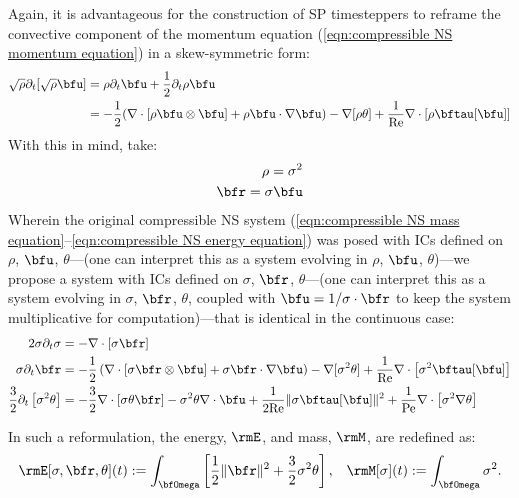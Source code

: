     \shortline

    Again, it is advantageous for the construction of SP timesteppers to reframe the convective component of the momentum equation (\ref{eqn:compressible NS momentum equation}) in a skew-symmetric form:
    \begin{align}
        \sqrt{\rho}\partial_{t}[\sqrt{\rho}\bfu]
        &=
        \rho\partial_{t}\bfu + \frac{1}{2}\partial_{t}\rho\bfu  \\
        &=
        - \frac{1}{2}(\nabla\cdot\left[\rho\bfu\otimes\bfu\right] + \rho\bfu\cdot\nabla\bfu) - \nabla[\rho\theta] + \frac{1}{\rmRe}\nabla\cdot[\rho\bftau[\bfu]]  \label{eqn:compressible NS skew-symmetric momentum equation}
    \end{align}
    With this in mind, take:
    \begin{align}
        \rho  =  \sigma^{2}  \label{eqn:sigma definition}  \\
        \bfr  =  \sigma\bfu  \label{eqn:r definition}
    \end{align}
    Wherein the original compressible NS system (\ref{eqn:compressible NS mass equation}--\ref{eqn:compressible NS energy equation}) was posed with ICs defined on $\rho$, $\bfu$, $\theta$---(one can interpret this as a system evolving in $\rho$, $\bfu$, $\theta$)---we propose a system with ICs defined on $\sigma$, $\bfr$, $\theta$---(one can interpret this as a system evolving in $\sigma$, $\bfr$, $\theta$, coupled with $\bfu = 1/\sigma\cdot\bfr$ to keep the system multiplicative for computation)---that is identical in the continuous case:
    \begin{align}
                                   2\sigma\partial_{t}\sigma  &=  - \nabla\cdot\left[\sigma\bfr\right]  \\
                                      \sigma\partial_{t}\bfr  &=  - \frac{1}{2}\left(\nabla\cdot\left[\sigma\bfr\otimes\bfu\right] + \sigma\bfr\cdot\nabla\bfu\right) - \nabla[\sigma^{2}\theta] + \frac{1}{\rmRe}\nabla\cdot\left[\sigma^{2}\bftau[\bfu]\right]  \\
        \frac{3}{2}\partial_{t}\left[\sigma^{2}\theta\right]  &=  - \frac{3}{2}\nabla\cdot\left[\sigma\theta\bfr\right] - \sigma^{2}\theta\nabla\cdot\bfu + \frac{1}{2\rmRe}\|\sigma\bftau[\bfu]\|^{2} + \frac{1}{\rmPe}\nabla\cdot\left[\sigma^{2}\nabla\theta\right]  \label{eqn:compressible NS sqrt energy equation}
    \end{align}

    In such a reformulation, the energy, $\rmE$, and mass, $\rmM$, are redefined as:
    \begin{align}
        \rmE[\sigma, \bfr, \theta](t)  :=  \int_{\bfOmega}\left[\frac{1}{2}\|\bfr\|^{2} + \frac{3}{2}\sigma^{2}\theta\right],  &&
                      \rmM[\sigma](t)  :=  \int_{\bfOmega}\sigma^{2}.
    \end{align}

